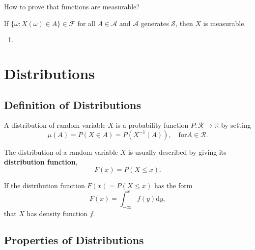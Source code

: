 How to prove that functions are measurable?

\begin{theorem}
	If $\{\omega:X(\omega)\in A\}\in\mathcal{F}$ for all $A\in\mathcal{A}$ and $\mathcal{A}$ generates $\mathcal{S}$, then $X$ is measurable.
\end{theorem}

\begin{enumerate}
	\item
\end{enumerate}

\section{Distributions}

\subsection{Definition of Distributions}

\begin{definition}[Distribution]
	A distribution of random variable $X$ is a probability function $P:\mathcal{R}\rightarrow\mathbb{R}$ by setting
	\begin{equation}
		\mu(A)=P(X\in A)=P\left(X^{-1}(A)\right),\quad\text{for}A\in\mathcal{R}.
	\end{equation}
\end{definition}

\begin{definition}
	The distribution of a random variable $X$ is usually described by giving its \textbf{distribution function},
	\begin{equation}
		F(x)=P(X\leq x).
	\end{equation}
\end{definition}

\begin{definition}
	If the distribution function $F(x)=P(X\leq x)$ has the form
	\begin{equation*}
		F(x)=\int_{-\infty}^{x}f(y)\mathrm{d}y,
	\end{equation*}
	that $X$ has density function $f$.
\end{definition}

\subsection{Properties of Distributions}


